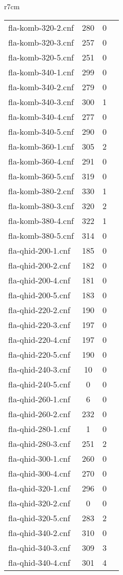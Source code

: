 \begin{wraptable}{r}{7cm}
\begin{tabular}{l| c c c }
fla-komb-320-2.cnf & 280 & 0 \\
fla-komb-320-3.cnf & 257 & 0 \\
fla-komb-320-5.cnf & 251 & 0 \\
fla-komb-340-1.cnf & 299 & 0 \\
fla-komb-340-2.cnf & 279 & 0 \\
fla-komb-340-3.cnf & 300 & 1 \\
fla-komb-340-4.cnf & 277 & 0 \\
fla-komb-340-5.cnf & 290 & 0 \\
fla-komb-360-1.cnf & 305 & 2 \\
fla-komb-360-4.cnf & 291 & 0 \\
fla-komb-360-5.cnf & 319 & 0 \\
fla-komb-380-2.cnf & 330 & 1 \\
fla-komb-380-3.cnf & 320 & 2 \\
fla-komb-380-4.cnf & 322 & 1 \\
fla-komb-380-5.cnf & 314 & 0 \\
fla-qhid-200-1.cnf & 185 & 0 \\
fla-qhid-200-2.cnf & 182 & 0 \\
fla-qhid-200-4.cnf & 181 & 0 \\
fla-qhid-200-5.cnf & 183 & 0 \\
fla-qhid-220-2.cnf & 190 & 0 \\
fla-qhid-220-3.cnf & 197 & 0 \\
fla-qhid-220-4.cnf & 197 & 0 \\
fla-qhid-220-5.cnf & 190 & 0 \\
fla-qhid-240-3.cnf & 10 & 0 \\
fla-qhid-240-5.cnf & 0 & 0 \\
fla-qhid-260-1.cnf & 6 & 0 \\
fla-qhid-260-2.cnf & 232 & 0 \\
fla-qhid-280-1.cnf & 1 & 0 \\
fla-qhid-280-3.cnf & 251 & 2 \\
fla-qhid-300-1.cnf & 260 & 0 \\
fla-qhid-300-4.cnf & 270 & 0 \\
fla-qhid-320-1.cnf & 296 & 0 \\
\fi
fla-qhid-320-2.cnf & 0 & 0 \\
fla-qhid-320-5.cnf & 283 & 2 \\
fla-qhid-340-2.cnf & 310 & 0 \\
fla-qhid-340-3.cnf & 309 & 3 \\
fla-qhid-340-4.cnf & 301 & 4 \\

\end{tabular}
\end{wraptable}
